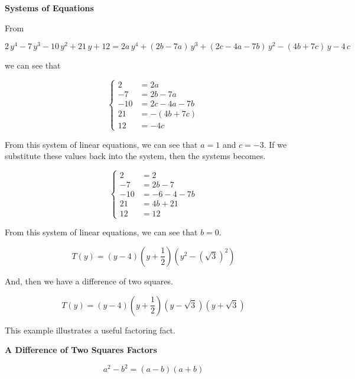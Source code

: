 \documentclass{ximera}
\begin{document}
\begin{procedure} \textbf{\textcolor{purple!85!blue}{Systems of Equations}} 



From

\[
2 \, y^4 - 7 \, y^3 - 10 \, y^2 + 21 \, y + 12 = 2 a \, y^4 + (2 b - 7 a) \, y^3 + (2 c - 4 a - 7 b) \, y^2 - (4 b + 7 c) \, y - 4 \, c
\]

we can see that 




\[
\begin{cases}
  2 &= 2 a   \\
  -7 &= 2 b - 7 a    \\
  -10 &= 2 c - 4 a - 7 b   \\
  21 &= -(4 b + 7 c)   \\
  12 &= -4 c
\end{cases}
\]


From this system of linear equations, we can see that $a = 1$ and $c = -3$.  If we substitute these values back into the system, then the systems becomes.






\[
\begin{cases}
  2 &= 2   \\
  -7 &= 2 b - 7     \\
  -10 &= -6 - 4 - 7 b   \\
  21 &= 4 b + 21   \\
  12 &= 12
\end{cases}
\]

From this system of linear equations, we can see that $b = 0$. 


\[
T(y) = (y-4) \left(y+\frac{1}{2}\right) (y^2 - (\sqrt{3})^2)
\]



And, then we have a difference of two squares.



\[
T(y) = (y-4) \left(y+\frac{1}{2}\right) (y - \sqrt{3}) (y + \sqrt{3})
\]




\end{procedure}




This example illustrates a useful factoring fact.



\begin{fact} \textbf{\textcolor{purple!85!blue}{A Difference of Two Squares Factors}}

\[
a^2 - b^2 = (a-b)(a+b)
\]

\end{fact}
\end{document}
